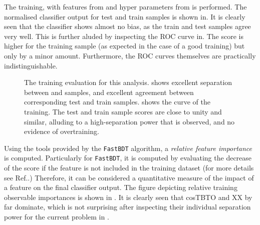 The training, with features from  and hyper parameters from  is performed.
The normalised classifier output for test and train samples is shown in.
It is clearly seen that the classifier shows almost no bias, as the train and test samples agree very well.
This is further aluded by inspecting the ROC curve in.
The \AUC score is higher for the training sample (as expected in the case of a good training) but only by a minor amount.
Furthermore, the ROC curves themselves are practically indistinguishable.

\begin{figure}[htbp!]
    \centering
    \caption{\label{fig:training_evaluation} The training evaluation for this analysis.
     shows excellent separation between \epem\ra\qqbar and \BtoXsgamma samples, and excellent agreement between corresponding test and train samples.
     shows the \ROC curve of the training. 
    The test and train sample \AUC scores are close to unity and similar, alluding to a high-separation power that is observed, and no evidence of overtraining.
    }
\end{figure}

Using the tools provided by the \texttt{FastBDT} algorithm, a \textit{relative feature importance} is computed.
Particularly for \texttt{FastBDT}, it is computed by evaluating the decrease of the \AUC score if the feature is not included in the training dataset (for more details see Ref.\cite{Keck:2017gsv}.)
Therefore, it can be considered a quantitative measure of the impact of a feature on the final classifier output.
The figure depicting relative training observable importances is shown in . 
It is clearly seen that cosTBTO and XX by far dominate, which is not surprising after inspecting their individual separation power for the current problem in .

